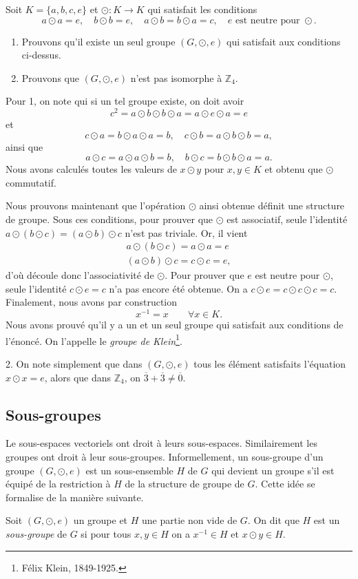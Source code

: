 \documentclass[french,course,oneside,theoremnosection]{lecture}
\newcommand{\Z}{\mathbb{Z}}
\begin{document}
\begin{example}\label{ex:klein}
Soit $K=\{a,b,c,e\}$ et $\odot\colon K \to K$ qui satisfait les conditions 
\[
a\odot a = e, \quad b \odot b = e, \quad a\odot b=b\odot a=c, \quad e \text{ est neutre pour } \odot.
\] 
\begin{enumerate}
\item Prouvons qu'il existe un seul groupe $(G, \odot, e)$ qui satisfait aux conditions ci-dessus.
\item Prouvons que $(G,  \odot, e)$ n'est pas isomorphe à $\Z_4$.
\end{enumerate}

Pour 1, on note qui si un tel groupe existe, on doit avoir
\[
c^2 = a\odot b \odot b \odot a = a \odot e \odot a = e
\]
et
\[
c\odot a = b \odot a \odot a = b, \quad c\odot b = a\odot b \odot b =a,
\]
ainsi que
\[
a \odot c = a \odot a \odot b =b, \quad b \odot c = b \odot b  \odot a = a.
\]
Nous avons calculés toutes les valeurs de $x \odot y$ pour $x, y \in K$ et obtenu que $\odot$ commutatif. 

Nous prouvons maintenant que l'opération $\odot$ ainsi obtenue définit une structure de groupe. Sous ces conditions, pour prouver que $\odot$ est associatif, seule l'identité $a\odot (b\odot c)=(a\odot b) \odot c$ n'est pas triviale. Or, il vient
\begin{gather*}
a\odot (b\odot c) = a \odot a =e\\
(a\odot b) \odot c = c \odot c =e,
\end{gather*}
d'où découle donc l'associativité de $\odot$. Pour prouver que $e$ est neutre pour $\odot$, seule l'identité $c \odot e=c$ n'a pas encore été obtenue. On a $c \odot e= c \odot c \odot c=c$. Finalement, nous avons par construction
\[
x^{-1} = x \qquad \forall x\in K.
\]
Nous avons prouvé qu'il y a un et un seul groupe qui satisfait aux conditions de l'énoncé. On l'appelle le \emph{groupe de Klein}\footnote{Félix Klein, 1849-1925.}.
\medskip

2. On note simplement que dans $(G, \odot, e)$ tous les élément satisfaits l'équation $x\odot x=e$, alors que dans $\Z_4$, on  $\overline {3} +\overline{3}\neq \overline{0}$.
\end{example}
\subsection{Sous-groupes}
Le sous-espaces vectoriels ont droit à leurs sous-espaces. Similairement les groupes ont droit à leur sous-groupes. Informellement, un sous-groupe d'un groupe $(G, \odot, e)$ est un sous-ensemble $H$ de $G$ qui devient un groupe s'il est équipé de la restriction à $H$ de la structure de groupe de $G$. Cette idée se formalise de la manière suivante.
\begin{definition}
Soit $(G, \odot, e)$ un groupe et $H$ une partie non vide de $G$. On dit que $H$ est un \emph{sous-groupe} de $G$ si pour tous $x, y\in H$ on a $x^{-1} \in H$ et $x\odot y \in H$.
\end{definition}
\end{document}
